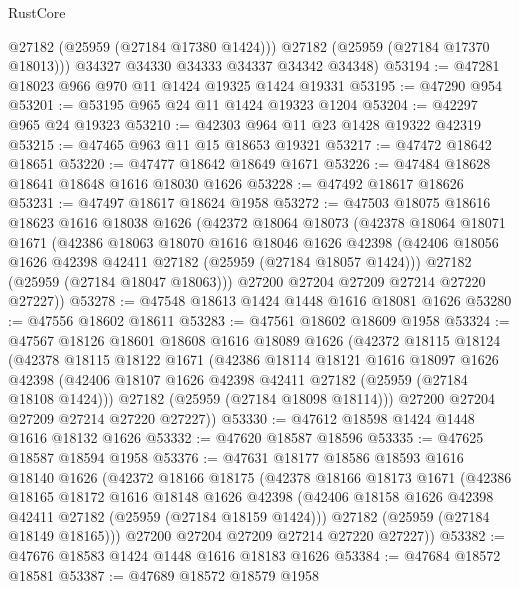 \begin{lexlean}{RustCore}
\begin{coremodule}
          @27182
          (@25959 (@27184 @17380 @1424)))
        @27182
        (@25959 (@27184 @17370 @18013)))
      @34327
      @34330
      @34333
      @34337
      @34342
      @34348)
@53194 := @47281 @18023 @966 @970 @11 @1424 @19325 @1424 @19331
@53195 := @47290 @954
@53201 := @53195 @965 @24 @11 @1424 @19323 @1204
@53204 := @42297 @965 @24 @19323
@53210 := @42303 @964 @11 @23 @1428 @19322 @42319
@53215 := @47465 @963 @11 @15 @18653 @19321
@53217 := @47472 @18642 @18651
@53220 := @47477 @18642 @18649 @1671
@53226 := @47484 @18628 @18641 @18648 @1616 @18030 @1626
@53228 := @47492 @18617 @18626
@53231 := @47497 @18617 @18624 @1958
@53272 := @47503
    @18075
    @18616
    @18623
    @1616
    @18038
    @1626
    (@42372
      @18064
      @18073
      (@42378
        @18064
        @18071
        @1671
        (@42386
          @18063
          @18070
          @1616
          @18046
          @1626
          @42398
          (@42406 @18056 @1626 @42398 @42411 @27182 (@25959 (@27184 @18057 @1424)))
          @27182
          (@25959 (@27184 @18047 @18063)))
        @27200
        @27204
        @27209
        @27214
        @27220
        @27227))
@53278 := @47548 @18613 @1424 @1448 @1616 @18081 @1626
@53280 := @47556 @18602 @18611
@53283 := @47561 @18602 @18609 @1958
@53324 := @47567
    @18126
    @18601
    @18608
    @1616
    @18089
    @1626
    (@42372
      @18115
      @18124
      (@42378
        @18115
        @18122
        @1671
        (@42386
          @18114
          @18121
          @1616
          @18097
          @1626
          @42398
          (@42406 @18107 @1626 @42398 @42411 @27182 (@25959 (@27184 @18108 @1424)))
          @27182
          (@25959 (@27184 @18098 @18114)))
        @27200
        @27204
        @27209
        @27214
        @27220
        @27227))
@53330 := @47612 @18598 @1424 @1448 @1616 @18132 @1626
@53332 := @47620 @18587 @18596
@53335 := @47625 @18587 @18594 @1958
@53376 := @47631
    @18177
    @18586
    @18593
    @1616
    @18140
    @1626
    (@42372
      @18166
      @18175
      (@42378
        @18166
        @18173
        @1671
        (@42386
          @18165
          @18172
          @1616
          @18148
          @1626
          @42398
          (@42406 @18158 @1626 @42398 @42411 @27182 (@25959 (@27184 @18159 @1424)))
          @27182
          (@25959 (@27184 @18149 @18165)))
        @27200
        @27204
        @27209
        @27214
        @27220
        @27227))
@53382 := @47676 @18583 @1424 @1448 @1616 @18183 @1626
@53384 := @47684 @18572 @18581
@53387 := @47689 @18572 @18579 @1958

\end{coremodule}
\end{lexlean}
